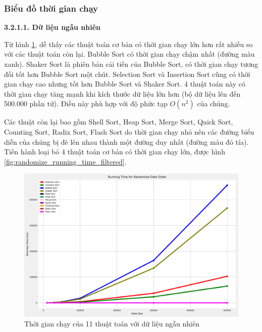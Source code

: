 \subsubsection{Biểu đồ thời gian chạy}

\textbf{3.2.1.1. Dữ liệu ngẫu nhiên}

Từ hình \ref{fig:randomize_running_time}, dễ thấy các thuật toán cơ bản có thời gian chạy lớn hơn rất nhiều so với các thuật toán còn lại. Bubble Sort có thời gian chạy chậm nhất (đường màu xanh). Shaker Sort là phiên bản cải tiến của Bubble Sort, có thời gian chạy tương đối tốt hơn Bubble Sort một chút. Selection Sort và Insertion Sort cũng có thời gian chạy cao nhưng tốt hơn Bubble Sort và Shaker Sort. 4 thuật toán này có thời gian chạy tăng mạnh khi kích thước dữ liệu lớn hơn (bộ dữ liệu lên đến 500.000 phần tử). Điều này phù hợp với độ phức tạp $O(n^2)$ của chúng.


Các thuật còn lại bao gồm Shell Sort, Heap Sort, Merge Sort, Quick Sort, Counting Sort, Radix Sort, Flash Sort do thời gian chạy nhỏ nên các đường biểu diễn của chúng bị đè lên nhau thành một đường duy nhất (đường màu đỏ tía). Tiến hành loại bỏ 4 thuật toán cơ bản có thời gian chạy lớn, được hình \ref{fig:randomize_running_time_filtered}.

\begin{figure}[H]
    \centering
    \includegraphics[width=\textwidth]{experimental_result/images/randomize_running_time.png}
    \caption{Thời gian chạy của 11 thuật toán với dữ liệu ngẫu nhiên}
    \label{fig:randomize_running_time}
\end{figure}



